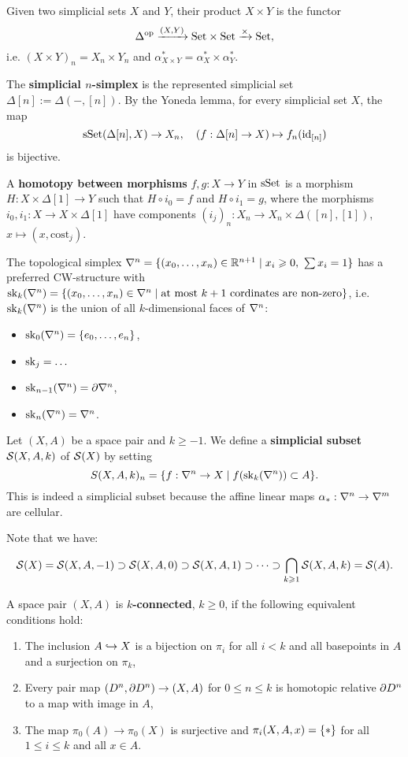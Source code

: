 

Given two simplicial sets $X$ and $Y$, their product $X\times Y$ is the functor \[\Delta^\op\xto{(X,Y)}\Set\times\Set\xto{\times}\Set,\] i.e. $(X\times Y)_n=X_n\times Y_n$ and $\alpha^*_{X\times Y}=\alpha^*_X\times\alpha^*_Y$.

The \textbf{simplicial $n$-simplex} is the represented simplicial set $\Delta[n]:=\Delta(-,[n])$. By the Yoneda lemma, for every simplicial set $X$, the map
\[\sSet(\Delta[n],X)\to X_n,\quad (f:\Delta[n]\to X)\mapsto f_n(\id_{[n]})\]
is bijective.

A \textbf{homotopy between morphisms} $f,g:X\to Y$ in $\sSet$ is a morphism $H:X\times\Delta[1]\to Y$ such that $H\circ i_0=f$ and $H\circ i_1=g$, where the morphisms $i_0,i_1:X\to X\times\Delta[1]$ have components $(i_j)_n:X_n\to X_n\times\Delta([n],[1])$, $x\mapsto(x,\text{cost}_j)$.

The topological simplex $\nabla^n=\cb{(\xso)\in\R^{n+1}\mid x_i\geq0,\ \sum x_i=1}$ has a preferred CW-structure with $\sk_k(\nabla^n)=\cb{(\xso)\in\nabla^n\mid\text{at most }k+1\text{ cordinates are non-zero}}$, i.e. $\sk_k(\ns)$ is the union of all $k$-dimensional faces of $\ns$:
\begin{itemize}
    \item $\sk_0(\nabla^n)=\cb{\nno{e}{n}}$,
    \item $\sk_j=\dots$
    \item $\sk_{n-1}(\nabla^n)=\de\nabla^n$,
    \item $\sk_n(\nabla^n)=\nabla^n$.
\end{itemize}\medskip

Let $(X,A)$ be a space pair and $k\geq-1$. We define a \textbf{simplicial subset} $\S(X,A,k)$ of $\S(X)$ by setting
\[S(X,A,k)_n=\cb{f:\ns\to X\mid f(\sk_k(\ns))\subset A}.\]
This is indeed a simplicial subset because the affine linear maps $\alpha_*:\ns\to\ms$ are cellular.

Note that we have:

\[\S(X)=\S(X,A,-1)\supset \S(X,A,0)\supset \S(X,A,1)\supset\dots\supset\bigcap_{k\geq1}\S(X,A,k)=\S(A).\]

A space pair $(X,A)$ is \textbf{$k$-connected}, $k\geq0$, if the following equivalent conditions hold:
\begin{enumerate}[label={(\alph*)},topsep=0.5\thmsep]
    \item The inclusion $A\hto X$ is a bijection on $\pi_i$ for all $i<k$ and all basepoints in $A$ and a surjection on $\pi_k$,
    \item Every pair map $(D^n,\de D^n)\to (X,A)$ for $0\leq n\leq k$ is homotopic relative $\de D^n$ to a map with image in $A$,
    \item The map $\pi_0(A)\to \pi_0(X)$ is surjective and $\pi_i(X,A,x)=\cb{*}$ for all $1\leq i\leq k$ and all $x\in A$.
\end{enumerate}

